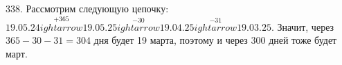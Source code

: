 338. Рассмотрим следующую цепочку: $19.05.24\stackrel{+365}{
ightarrow}19.05.25\stackrel{-30}{
ightarrow}19.04.25
\stackrel{-31}{
ightarrow}19.03.25.$ Значит, через $365-30-31=304$ дня будет 19 марта, поэтому и через 300 дней тоже будет март.\\

